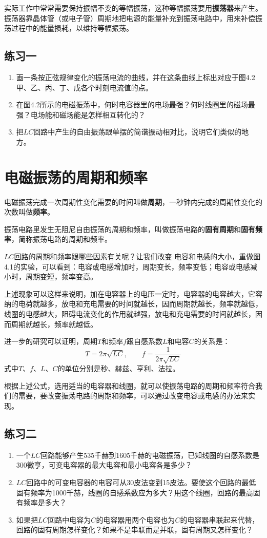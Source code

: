 实际工作中常常需要保持振幅不变的等幅振荡，这种等幅振荡要用\textbf{振荡器}来产生。振荡器靠晶体管（或电子管）周期地把电源的能量补充到振荡电路中，用来补偿振荡过程中的能量损耗，以维持等幅振荡。

\subsection*{练习一}
\begin{enumerate}
	\item 画一条按正弦规律变化的振荡电流的曲线，并在这条曲线上标出对应于图4.2甲、乙、丙、丁、戊各个时刻电流值的点。
	\item 在图4.2所示的电磁振荡中，何时电容器里的电场最强？何时线圈里的磁场最强？电场能和磁场能是怎样相互转化的？
	\item 把$LC$回路中产生的自由振荡跟单摆的简谐振动相对比，说明它们类似的地方。
\end{enumerate}


\section{电磁振荡的周期和频率}
电磁振荡完成一次周期性变化需要的时间叫做\textbf{周期}，一秒钟内完成的周期性变化的次数叫做\textbf{频率}。

振荡电路里发生无阻尼自由振荡的周期和频率，叫做振荡电路的\textbf{固有周期}和\textbf{固有频率}，简称振荡电路的周期和频率。

$LC$回路的周期和频率跟哪些因素有关呢？让我们改变
电容和电感的大小，重做图4.1的实验，可以看到：电容或电感增加时，周期变长，频率变低；电容或电感减小时，周期变短，频率变高。

上述现象可以这样来说明，加在电容器上的电压一定时，电容器的电容越大，它容纳的电荷就越多，放电和充电需要的时间就越长，因而周期就越长，频率就越低，线圈的电感越大，阻碍电流变化的作用就越强，放电和充电需要的时间就越长，因而周期就越长，频率就越低。

进一步的研究可以证明，周期$T$和频率$f$跟自感系数$L$和电容$C$的关系是：
\[T=2\pi\sqrt{LC},\qquad f=\frac{1}{2\pi\sqrt{LC}} \]
式中$T$、$f$、$L$、$C$的单位分别是秒、赫兹、亨利、法拉。

根据上述公式，选用适当的电容器和线圈，就可以使振荡电路的周期和频率符合我们的需要，要改变振荡电路的周期和频率，可以通过改变电容或电感的办法来实现。

\subsection*{练习二}
\begin{enumerate}
	\item 一个$LC$回路能够产生535千赫到1605千赫的电磁振荡，已知线圈的自感系数是300微亨，可变电容器的最大电容和最小电容各是多少？
	\item $LC$回路中的可变电容器的电容可从30皮法变到15皮法。要使这个回路的最低固有频率为1000千赫，线圈的自感系数应为多大？用这个线圈，回路的最高固有频率是多大？
	\item 如果把$LC$回路中电容为$C$的电容器用两个电容也为$C$的电容器串联起来代替，回路的固有周期怎样变化？如果不是串联而是并联，固有周期又怎样变化？
\end{enumerate}


